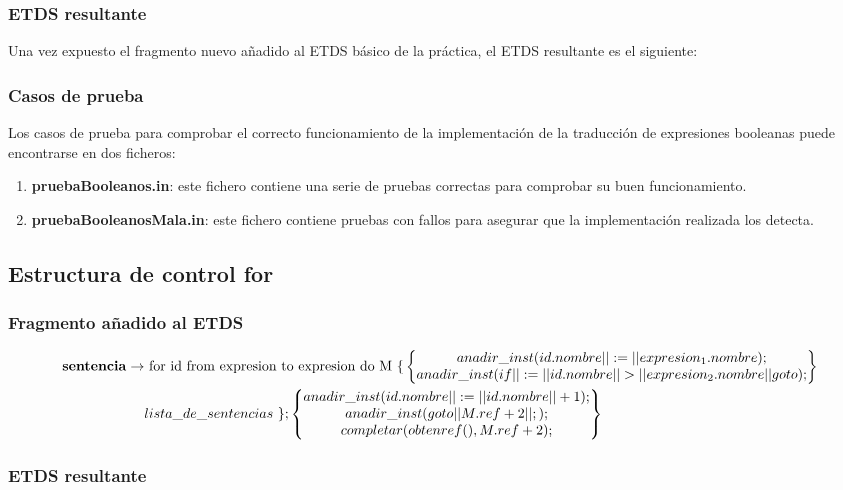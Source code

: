 \documentclass[12pt,a4paper,landscape]{article}
\theoremstyle{mytheor}
\begin{document}
\subsubsection{ETDS resultante}
Una vez expuesto el fragmento nuevo añadido al ETDS básico de la práctica, el ETDS resultante es el siguiente: 
\subsubsection{Casos de prueba}
Los casos de prueba para comprobar el correcto funcionamiento de la implementación de la traducción de expresiones booleanas puede encontrarse en dos ficheros:
\begin{enumerate}
\item \textbf{pruebaBooleanos.in}: este fichero contiene una serie de pruebas correctas para comprobar su buen funcionamiento.
\item \textbf{pruebaBooleanosMala.in}: este fichero contiene pruebas con fallos para asegurar que la implementación realizada los detecta.
\end{enumerate}

\subsection{Estructura de control for}

\subsubsection{Fragmento añadido al ETDS}
\begin{center}
     \begin{alignat*}{2}
      \text{ \textbf{sentencia}} \to & \text{ for id from expresion to expresion do M \{}\begin{Bmatrix} anadir\_inst(id.nombre||:=||expresion_1.nombre);\\ anadir\_inst(if||:=||id.nombre||>||expresion_2.nombre||goto);\end{Bmatrix} \\
     & lista\_de\_sentencias\ \}; \begin{Bmatrix} anadir\_inst(id.nombre||:=||id.nombre|| +1);\\ anadir\_inst(goto||M.ref +2||;);\\ completar(obtenref(), M.ref+2);\end{Bmatrix} 
      \end{alignat*}
\end{center}
\subsubsection{ETDS resultante}
\end{document}
